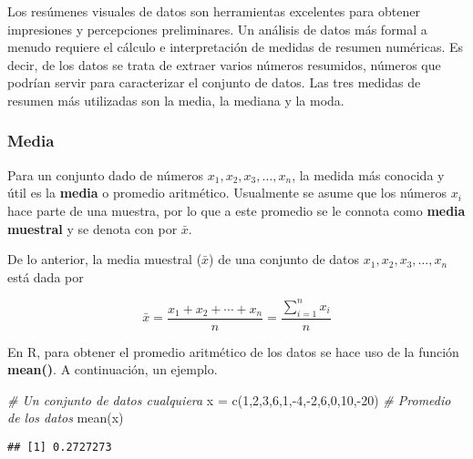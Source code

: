\documentclass[
]{book}
\newenvironment{Shaded}{\begin{snugshade}}{\end{snugshade}}
\newcommand{\CommentTok}[1]{\textcolor[rgb]{0.56,0.35,0.01}{\textit{#1}}}
\newcommand{\DecValTok}[1]{\textcolor[rgb]{0.00,0.00,0.81}{#1}}
\newcommand{\FunctionTok}[1]{\textcolor[rgb]{0.00,0.00,0.00}{#1}}
\newcommand{\NormalTok}[1]{#1}
\newcommand{\OtherTok}[1]{\textcolor[rgb]{0.56,0.35,0.01}{#1}}
\newcommand{\SpecialCharTok}[1]{\textcolor[rgb]{0.00,0.00,0.00}{#1}}
\theoremstyle{definition}
\theoremstyle{definition}
\theoremstyle{definition}
\theoremstyle{definition}
\theoremstyle{remark}
\begin{document}
Los resúmenes visuales de datos son herramientas excelentes para obtener impresiones y percepciones preliminares. Un análisis de datos más formal a menudo requiere el cálculo e interpretación de medidas de resumen numéricas. Es decir, de los datos se trata de extraer varios números resumidos, números que podrían servir para caracterizar el conjunto de datos. Las tres medidas de resumen más utilizadas son la media, la mediana y la moda.

\hypertarget{media}{%
\subsubsection*{Media}\label{media}}

Para un conjunto dado de números \(x_1, x_2, x_3, \ldots, x_n\), la medida más conocida y útil es la \textbf{media} o promedio aritmético. Usualmente se asume que los números \(x_i\) hace parte de una muestra, por lo que a este promedio se le connota como \textbf{media muestral} y se denota con por \(\bar{x}\).

De lo anterior, la media muestral (\(\bar{x}\)) de una conjunto de datos \(x_1, x_2, x_3, \ldots, x_n\) está dada por \citep[página 25]{Devore}

\begin{equation}
\bar{x} = \frac{x_1 + x_2 + \cdots + x_n}{n} = \frac{\displaystyle\sum_{i=1}^{n}x_i}{n}
\label{eq:promedio}
\end{equation}

En R, para obtener el promedio aritmético de los datos se hace uso de la función \textbf{mean()}. A continuación, un ejemplo.

\begin{Shaded}
\begin{Highlighting}[]
\CommentTok{\# Un conjunto de datos cualquiera}
\NormalTok{x }\OtherTok{=} \FunctionTok{c}\NormalTok{(}\DecValTok{1}\NormalTok{,}\DecValTok{2}\NormalTok{,}\DecValTok{3}\NormalTok{,}\DecValTok{6}\NormalTok{,}\DecValTok{1}\NormalTok{,}\SpecialCharTok{{-}}\DecValTok{4}\NormalTok{,}\SpecialCharTok{{-}}\DecValTok{2}\NormalTok{,}\DecValTok{6}\NormalTok{,}\DecValTok{0}\NormalTok{,}\DecValTok{10}\NormalTok{,}\SpecialCharTok{{-}}\DecValTok{20}\NormalTok{)}
\CommentTok{\# Promedio de los datos}
\FunctionTok{mean}\NormalTok{(x)}
\end{Highlighting}
\end{Shaded}

\begin{verbatim}
## [1] 0.2727273
\end{verbatim}
\end{document}

